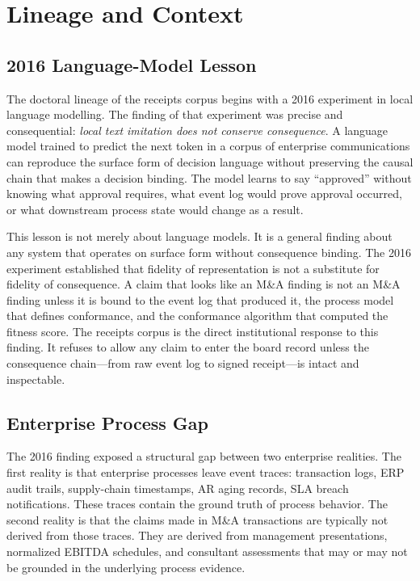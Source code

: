 \section{Lineage and Context}
\label{sec:receipts-lineage}

\subsection{2016 Language-Model Lesson}
\label{sec:receipts-lineage-lm}

The doctoral lineage of the receipts corpus begins with a 2016 experiment in local language
modelling. The finding of that experiment was precise and consequential: \emph{local text
imitation does not conserve consequence}. A language model trained to predict the next token
in a corpus of enterprise communications can reproduce the surface form of decision language
without preserving the causal chain that makes a decision binding. The model learns to say
``approved'' without knowing what approval requires, what event log would prove approval
occurred, or what downstream process state would change as a result.

This lesson is not merely about language models. It is a general finding about any system
that operates on surface form without consequence binding. The 2016 experiment established
that fidelity of representation is not a substitute for fidelity of consequence. A claim
that looks like an M\&A finding is not an M\&A finding unless it is bound to the event
log that produced it, the process model that defines conformance, and the conformance
algorithm that computed the fitness score. The receipts corpus is the direct institutional
response to this finding. It refuses to allow any claim to enter the board record unless
the consequence chain---from raw event log to signed receipt---is intact and inspectable.

\subsection{Enterprise Process Gap}
\label{sec:receipts-lineage-gap}

The 2016 finding exposed a structural gap between two enterprise realities. The first
reality is that enterprise processes leave event traces: transaction logs, ERP audit
trails, supply-chain timestamps, AR aging records, SLA breach notifications. These traces
contain the ground truth of process behavior. The second reality is that the claims made
in M\&A transactions are typically not derived from those traces. They are derived from
management presentations, normalized EBITDA schedules, and consultant assessments that
may or may not be grounded in the underlying process evidence.

